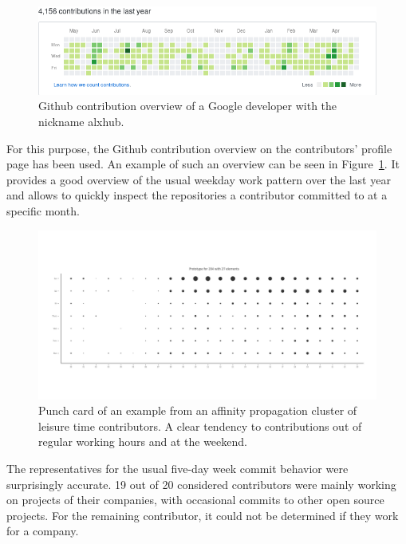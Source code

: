 \begin{figure}[H]
    \includegraphics[scale=0.6]{./graphs/contribution-overview-alxhub}
    \centering
    \caption{Github contribution overview of a Google developer with the nickname alxhub.}\label{fig:github-contribution-overview}
\end{figure}

For this purpose, the Github contribution overview on the contributors' profile page has been used.
An example of such an overview can be seen in Figure~\ref{fig:github-contribution-overview}.
It provides a good overview of the usual weekday work pattern over the last year and allows to quickly inspect the repositories a contributor committed to at a specific month.

\begin{figure}[H]
    \includegraphics[scale=0.32]{./graphs/analysis-affinity/204}
    \centering
    \caption{Punch card of an example from an affinity propagation cluster of leisure time contributors. A clear tendency to contributions out of regular working hours and at the weekend.}\label{fig:leisure-time-hours}
\end{figure}

The representatives for the usual five-day week commit behavior were surprisingly accurate.
19 out of 20 considered contributors were mainly working on projects of their companies, with occasional commits to other open source projects.
For the remaining contributor, it could not be determined if they work for a company.


